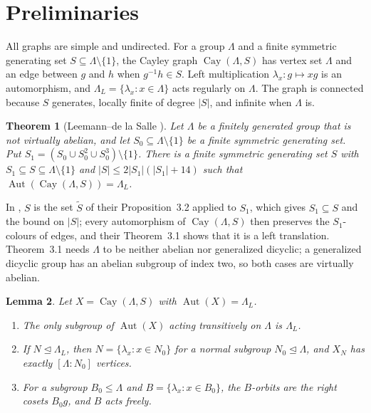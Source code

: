 \documentclass[11pt]{amsart}
\newtheorem{theorem}{Theorem}[section]
\newtheorem{lemma}[theorem]{Lemma}
\theoremstyle{definition}
\theoremstyle{remark}
\DeclareMathOperator{\Aut}{Aut}
\DeclareMathOperator{\Cay}{Cay}
\begin{document}
\section{Preliminaries}

All graphs are simple and undirected. For a group $\Lambda$ and a finite symmetric generating set $S\subseteq\Lambda\setminus\{1\}$, the Cayley graph $\Cay(\Lambda,S)$ has vertex set $\Lambda$ and an edge between $g$ and $h$ when $g^{-1}h\in S$. Left multiplication $\lambda_x\colon g\mapsto xg$ is an automorphism, and $\Lambda_L=\{\lambda_x:x\in\Lambda\}$ acts regularly on $\Lambda$. The graph is connected because $S$ generates, locally finite of degree $|S|$, and infinite when $\Lambda$ is.

\begin{theorem}[Leemann--de la Salle {\cite[Thm.~1.1 and its proof, Sect.~5]{LdS}}]\label{thm:LdS}
Let $\Lambda$ be a finitely generated group that is not virtually abelian, and let $S_0\subseteq\Lambda\setminus\{1\}$ be a finite symmetric generating set. Put $S_1=(S_0\cup S_0^2\cup S_0^3)\setminus\{1\}$. There is a finite symmetric generating set $S$ with $S_1\subseteq S\subseteq\Lambda\setminus\{1\}$ and $|S|\le2|S_1|(|S_1|+14)$ such that $\Aut(\Cay(\Lambda,S))=\Lambda_L$.
\end{theorem}

In \cite{LdS}, $S$ is the set $\widetilde S$ of their Proposition~3.2 applied to $S_1$, which gives $S_1\subseteq S$ and the bound on $|S|$; every automorphism of $\Cay(\Lambda,S)$ then preserves the $S_1$-colours of edges, and their Theorem~3.1 shows that it is a left translation. Theorem~3.1 needs $\Lambda$ to be neither abelian nor generalized dicyclic; a generalized dicyclic group has an abelian subgroup of index two, so both cases are virtually abelian.

\begin{lemma}\label{lem:regular}
Let $X=\Cay(\Lambda,S)$ with $\Aut(X)=\Lambda_L$.
\begin{enumerate}
\item The only subgroup of $\Aut(X)$ acting transitively on $\Lambda$ is $\Lambda_L$.
\item If $N\trianglelefteq\Lambda_L$, then $N=\{\lambda_x:x\in N_0\}$ for a normal subgroup $N_0\trianglelefteq\Lambda$, and $X_N$ has exactly $[\Lambda:N_0]$ vertices.
\item For a subgroup $B_0\le\Lambda$ and $B=\{\lambda_x:x\in B_0\}$, the $B$-orbits are the right cosets $B_0g$, and $B$ acts freely.
\end{enumerate}
\end{lemma}
\end{document}
